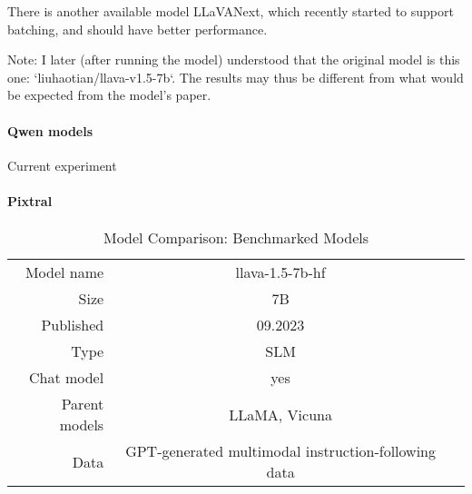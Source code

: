 \documentclass{article}
\begin{document}
There is another available model LLaVANext, which recently started to support batching, and should have better performance. 

Note: I later (after running the model) understood that the original model is this one: `liuhaotian/llava-v1.5-7b`. The results may thus be different from what would be expected from the model's paper. 



 

\paragraph{Qwen models} 
Current experiment

\paragraph{Pixtral}

\begin{table}
\centering
\begin{tabular}{rcc}
	\toprule
	Model name & llava-1.5-7b-hf & \\
	Size & 7B & \\
	Published & 09.2023 & \\
	Type & SLM & \\
	Chat model & yes & \\
	Parent models & LLaMA, Vicuna & \\
	Data & GPT-generated multimodal instruction-following data & \\
	\bottomrule
\end{tabular}
\caption{Model Comparison: Benchmarked Models}
\end{table}

\end{document}
